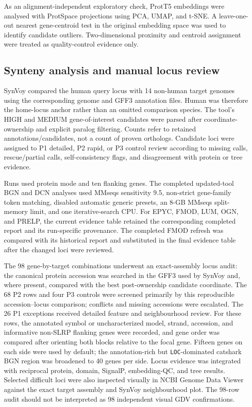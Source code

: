 As an alignment-independent exploratory check, ProtT5 embeddings were analysed
with ProtSpace projections using PCA, UMAP, and t-SNE. A leave-one-out nearest
gene-centroid test in the original embedding space was used to identify
candidate outliers. Two-dimensional proximity and centroid assignment were
treated as quality-control evidence only.

\subsection{Synteny analysis and manual locus review}
\label{subsec:synteny-analysis}

SynVoy compared the human query locus with 14 non-human target genomes using
the corresponding genome and GFF3 annotation files. Human was therefore the
home-locus anchor rather than an omitted comparison species. The tool's HIGH
and MEDIUM gene-of-interest candidates were parsed after coordinate-ownership
and explicit paralog filtering. Counts refer to retained annotations/candidates,
not a count of proven orthologs. Candidate loci were assigned to P1 detailed,
P2 rapid, or P3 control review according to missing calls, rescue/partial calls,
self-consistency flags, and disagreement with protein or tree evidence.

Runs used protein mode and ten flanking genes. The completed updated-tool BGN
and DCN analyses used MMseqs sensitivity 9.5, non-strict gene-family token
matching, disabled automatic generic presets, an 8-GB MMseqs split-memory
limit, and one iterative-search CPU. For EPYC, FMOD, LUM, OGN, and PRELP, the
current evidence table retained the corresponding completed report and its
run-specific provenance. The completed FMOD refresh was compared with its
historical report and substituted in the final evidence table after the changed
loci were reviewed.

The 98 gene-by-target combinations underwent an exact-assembly locus audit:
the canonical protein accession was searched in the GFF3 used by SynVoy and,
where present, compared with the best post-ownership candidate coordinate.
The 68 P2 rows and four P3 controls were screened primarily by this
reproducible accession--locus comparison; conflicts and missing accessions
were escalated. The 26 P1 exceptions received detailed feature and
neighbourhood review. For these rows, the
annotated symbol or uncharacterized model, strand, accession, and informative
non-SLRP flanking genes were recorded, and gene order was compared after
orienting both blocks relative to the focal gene. Fifteen genes on each side
were used by default; the annotation-rich but \texttt{LOC}-dominated catshark BGN
region was broadened to 40 genes per side. Locus evidence was integrated with
reciprocal protein, domain, SignalP, embedding-QC, and tree results.
Selected difficult loci were also inspected visually in NCBI Genome Data Viewer
against the exact target assembly and SynVoy neighbourhood plot. The 98-row
audit should not be interpreted as 98 independent visual GDV confirmations.

